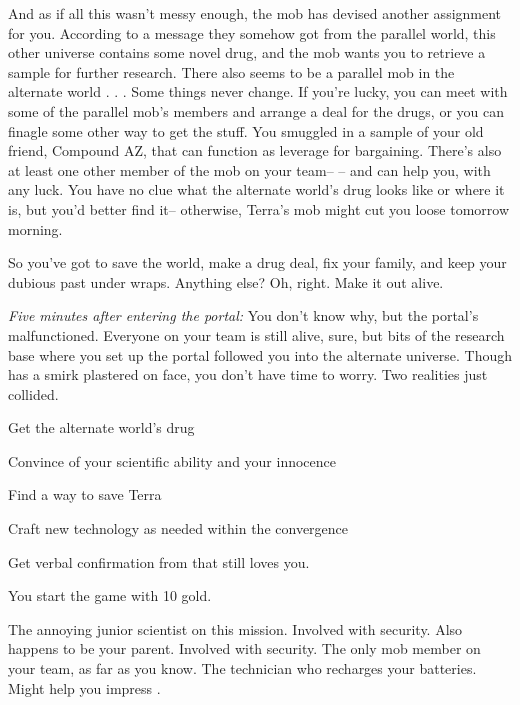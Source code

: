 \documentclass[char]{guildcamp3}
\begin{document}
And as if all this wasn't messy enough, the mob has devised another assignment for you. According to a message they somehow got from the parallel world, this other universe contains some novel drug, and the mob wants you to retrieve a sample for further research. There also seems to be a parallel mob in the alternate world . . . Some things never change. If you're lucky, you can meet with some of the parallel mob's members and arrange a deal for the drugs, or you can finagle some other way to get the stuff. You smuggled in a sample of your old friend, Compound AZ, that can function as leverage for bargaining. There's also at least one other member of the mob on your team-- \cSpecOpTwo{\intro}-- and \cSpecOpTwo{\they} can help you, with any luck. You have no clue what the alternate world's drug looks like or where it is, but you'd better find it-- otherwise, Terra's mob might cut you loose tomorrow morning.

So you've got to save the world, make a drug deal, fix your family, and keep your dubious past under wraps. Anything else? Oh, right. Make it out alive.

\emph{Five minutes after entering the portal:}
You don't know why, but the portal's malfunctioned. Everyone on your team is still alive, sure, but bits of the research base where you set up the portal followed you into the alternate universe. Though \cSciOne{} has a smirk plastered on \cSciOne{\their} face, you don't have time to worry. Two realities just collided.

\begin{itemz}[Goals]
  \item Get the alternate world's drug
  \item Convince \cSciTwo{} of your scientific ability and your innocence
  \item Find a way to save Terra
  \item Craft new technology as needed within the convergence
  \item Get verbal confirmation from \cSpecOpOne{} that \cSpecOpOne{\they} still loves you.
\end{itemz}

\begin{itemz}[Notes]
	\item You start the game with 10 gold. 
\end{itemz}

\begin{contacts}
  \contact{\cSciTwo{}} The annoying junior scientist on this mission.
  \contact{\cSpecOpOne{}} Involved with security. Also happens to be your parent.
  \contact{\cSpecOpTwo{}} Involved with security. The only mob member on your team, as far as you know.
  \contact{\cTech{}} The technician who recharges your batteries. Might help you impress \cSciTwo{}.
\end{contacts}
\end{document}
